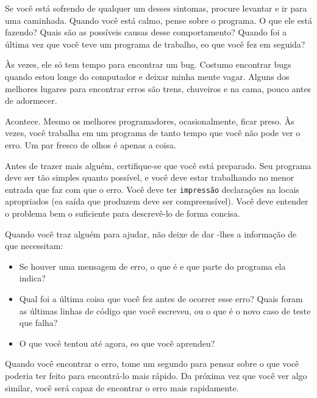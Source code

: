 \documentclass[10pt]{book}
\begin{document}
\begin{exercise}
\begin{v erbatim}
\begin{itemize}
\end{itemize}

Se você está sofrendo de qualquer um desses sintomas, procure
levantar e ir para uma caminhada. Quando você está calmo, pense sobre o programa.
O que ele está fazendo? Quais são as possíveis causas desse
comportamento? Quando foi a última vez que você teve um programa de trabalho,
eo que você fez em seguida?

Às vezes, ele só tem tempo para encontrar um bug. Costumo encontrar bugs
quando estou longe do computador e deixar minha mente vagar. Alguns
dos melhores lugares para encontrar erros são trens, chuveiros e na cama,
pouco antes de adormecer.



Acontece. Mesmo os melhores programadores, ocasionalmente, ficar preso.
Às vezes, você trabalha em um programa de tanto tempo que você não pode ver o
erro. Um par fresco de olhos é apenas a coisa.

Antes de trazer mais alguém, certifique-se que você está preparado.
Seu programa deve ser tão simples
quanto possível, e você deve estar trabalhando no menor entrada
que faz com que o erro. Você deve ter {\tt impressão} declarações na
locais apropriados (ea saída que produzem deve ser
compreensível). Você deve entender o problema bem o suficiente
para descrevê-lo de forma concisa.

Quando você traz alguém para ajudar, não deixe de dar
-lhes a informação de que necessitam:

\begin{itemize}

\item Se houver uma mensagem de erro, o que é
e que parte do programa ela indica?

\item Qual foi a última coisa que você fez antes de ocorrer esse erro?
Quais foram as últimas linhas de código que você escreveu, ou o que é
o novo caso de teste que falha?

\item O que você tentou até agora, eo que você aprendeu?

\end{itemize}

Quando você encontrar o erro, tome um segundo para pensar sobre o que você
poderia ter feito para encontrá-lo mais rápido. Da próxima vez que você ver algo
similar, você será capaz de encontrar o erro mais rapidamente.


\end{v erbatim}
\end{exercise}
\end{document}
